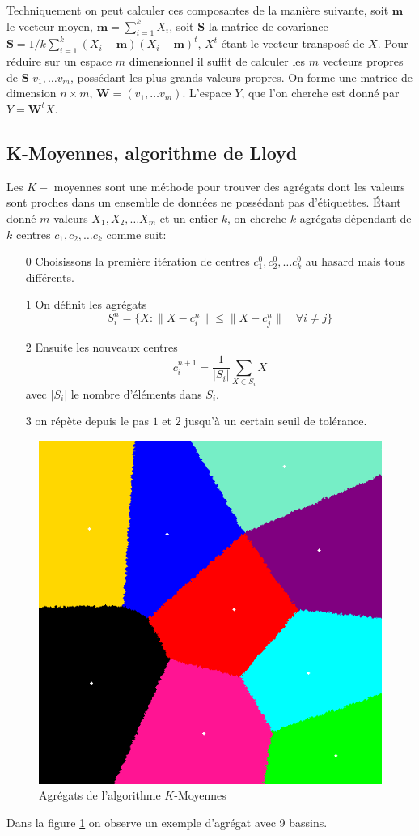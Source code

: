 \documentclass[DIV=calc, paper=a4, fontsize=11pt, twocolumn]{scrartcl}
\begin{document}
Techniquement on peut calculer ces composantes de la manière suivante, soit $\mathbf{m}$ le vecteur moyen, $\mathbf{m} = \sum_{i=1}^k X_i$, soit $\mathbf{S}$ la matrice de covariance $\mathbf{S} = 1/k \sum_{i=1}^k (X_i - \mathbf{m})(X_i - \mathbf{m})^t$, $X^t$ étant le vecteur transposé de $X$. Pour réduire sur un espace $m$ dimensionnel il suffit de calculer les $m$ vecteurs propres de $\mathbf{S}$ $v_1, \ldots v_m$, possédant les plus grands valeurs propres. On forme une matrice de dimension $n \times m$, $\mathbf{W} = (v_1, \ldots v_m)$. L'espace $Y$, que l'on cherche est donné par $Y = \mathbf{W}^t X$.
\subsection{K-Moyennes, algorithme de Lloyd}
Les $K-$ moyennes sont une méthode pour trouver des agrégats dont les valeurs sont proches dans un ensemble de données ne possédant pas d'étiquettes. Étant donné $m$ valeurs $X_1, X_2, \ldots X_m$ et un entier $k$, on cherche $k$ agrégats dépendant de $k$ centres $c_1, c_2, \ldots c_k$ comme suit:
\begin{itemize}
  \item[0] Choisissons la première itération de centres $c_1^0, c_2^0, \ldots c_k^0$ au hasard mais tous différents.
  \item[1] On définit les agrégats 
    $$S_i^n = \{ X : \| X - c_i^n \| \leq \|X - c_j^n \| \quad \forall i \neq j \}$$
  \item[2] Ensuite les nouveaux centres
    $$c_i^{n+1} = \frac{1}{|S_i|} \sum_{X \in S_i} X$$
avec $|S_i|$ le nombre d'éléments dans $S_i$.
  \item[3] on répète depuis le pas $1$ et $2$ jusqu'à un certain seuil de tolérance.
\end{itemize}
\begin{figure}
  \centering
    \includegraphics[width=0.5\linewidth]{centers}
  \caption{Agrégats de l'algorithme $K$-Moyennes}
  \label{fig:kmeans}
\end{figure}
Dans la figure \ref{fig:kmeans} on observe un exemple d'agrégat avec 9 bassins.
\end{document}
